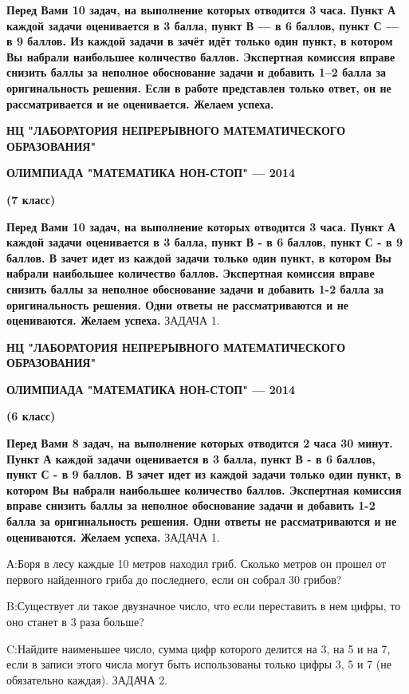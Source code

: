 \documentclass[10pt]{scrbook} \usepackage{modules/nonstahp_book}
\begin{document}
\medbreak
\noindent
{\bf Перед Вами 10 задач, на выполнение которых отводится 3 часа. Пункт А каждой задачи оценивается в 3 балла, пункт В --- в 6 баллов, пункт С --- в  9 баллов. Из каждой задачи в зачёт идёт только один пункт, в котором Вы набрали наибольшее количество баллов. Экспертная комиссия вправе снизить баллы за неполное обоснование задачи и добавить 1--2 балла за оригинальность решения. Если в работе представлен только ответ, он не рассматривается и не оценивается. Желаем успеха.}
\medbreak
\noindent

\vfil\eject
\centerline{\bf НЦ "ЛАБОРАТОРИЯ НЕПРЕРЫВНОГО МАТЕМАТИЧЕСКОГО ОБРАЗОВАНИЯ"}
\centerline{\bf ОЛИМПИАДА "МАТЕМАТИКА НОН-СТОП" — 2014}
\bigbreak 
\centerline{\bf (7 класс)}
\medbreak
\noindent
{\bf Перед Вами  10  задач, на выполнение которых отводится  3 часа. Пункт А каждой задачи оценивается в 3 балла, пункт В - в 6 баллов, пункт С - в  9 баллов. В зачет идет из каждой задачи только один пункт, в котором Вы набрали наибольшее количество баллов. Экспертная комиссия вправе снизить баллы за неполное обоснование задачи и добавить 1-2 балла за оригинальность решения. Одни ответы не рассматриваются и не оцениваются. Желаем успеха.}
\medbreak
\noindent
ЗАДАЧА 1.



\vfill\eject
\centerline{\bf НЦ "ЛАБОРАТОРИЯ НЕПРЕРЫВНОГО МАТЕМАТИЧЕСКОГО ОБРАЗОВАНИЯ"}
\centerline{\bf ОЛИМПИАДА "МАТЕМАТИКА НОН-СТОП" — 2014}
\bigbreak
\centerline{\bf  (6 класс)}
\medbreak
\noindent
{\bf Перед Вами  8  задач, на выполнение которых отводится  2 часа 30 минут. Пункт А каждой задачи оценивается в 3 балла, пункт В - в 6 баллов, пункт С - в  9 баллов. В зачет идет из каждой задачи только один пункт, в котором Вы набрали наибольшее количество баллов. Экспертная комиссия вправе снизить баллы за неполное обоснование задачи и добавить 1-2 балла за оригинальность решения. Одни ответы не рассматриваются и не оцениваются. Желаем успеха.}
\medbreak
\noindent
ЗАДАЧА 1. 

А:\qquad Боря в лесу каждые 10 метров находил гриб. Сколько метров он прошел от первого найденного гриба до последнего, если он собрал 30 грибов?

B:\qquad Существует ли такое двузначное число, что если переставить в нем цифры, то оно станет в 3 раза больше?

C:\qquad Найдите наименьшее число, сумма цифр которого делится на 3, на 5 и на 7, если в записи этого числа могут быть использованы только цифры 3, 5 и 7 (не обязательно каждая).
\medbreak
\noindent
ЗАДАЧА 2.
\end{document}

